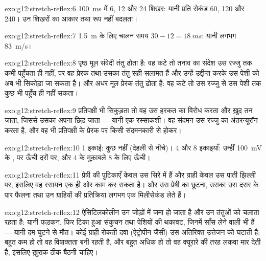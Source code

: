 \begin{solution}{exo:g12:stretch-reflex:6}
\qty{100}{ms} में 6, 12 और 24 शिखर: यानी प्रति सेकंड 60, 120 और 240। उन
शिखरों का आकार तथा रूप नहीं बदलता।
\end{solution}

\begin{solution}{exo:g12:stretch-reflex:7}
\qty{1.5}{m} के लिए चालन समय $30 - 12 = \qty{18}{ms}$: यानी लगभग
\qty{83}{m/s}।
\end{solution}

\begin{solution}{exo:g12:stretch-reflex:8}
पृष्ठ मूल संवेदी तंतु ढोता है: वह कटे तो तनाव का संदेश उस रज्जु तक कभी पहुँचता
ही नहीं, पर वह प्रेरक  तथा उसका तंतु सही-सलामत हैं और उन्हें उद्दीप्त
करके उस पेशी को अब भी सिकोड़ा जा सकता है। और अधर मूल प्रेरक तंतु ढोता है: वह
कटे तो उस रज्जु से उस पेशी तक कुछ भी पहुँच ही नहीं सकता।
\end{solution}

\begin{solution}{exo:g12:stretch-reflex:9}
प्रतिपक्षी भी सिकुड़ता तो वह उस हरकत का विरोध करता और ख़ुद तन जाता, जिससे
उसका अपना  छिड़ जाता --- यानी एक रस्साकशी। वह संदमन उस रज्जु का
अंतरन्यूरॉन करता है, और वह भी प्रतिपक्षी के प्रेरक  पर किसी
संदमनकारी  से होकर।
\end{solution}

\begin{solution}{exo:g12:stretch-reflex:10}
1 इकाई: कुछ नहीं (देहली से नीचे)। 4 और 8 इकाइयाँ: उन्हीं \qty{100}{mV} के
, पर ऊँची दरों पर, और 4 के मुक़ाबले 8 के लिए ऊँची।
\end{solution}

\begin{solution}{exo:g12:stretch-reflex:11}
प्रेषी की पुटिकाएँ केवल उस सिरे में हैं और ग्राही केवल उस पाती झिल्ली पर,
इसलिए वह रसायन एक ही ओर काम कर सकता है। और उस प्रेषी का छूटना, उसका उस दरार
के पार फैलना तथा उन ग्राहियों की प्रतिक्रिया लगभग एक मिलीसेकंड लेते हैं।
\end{solution}

\begin{solution}{exo:g12:stretch-reflex:12}
ऐसिटिलकोलीन उन जोड़ों में जमा हो जाता है और उन तंतुओं को चलाता रहता है:
यानी फड़कन, फिर टिका हुआ संकुचन तथा पेशियों की थकावट, जिनमें साँस लेने वाली
भी हैं --- यानी दम घुटने से मौत। कोई ग्राही रोकती दवा (ऐट्रोपीन जैसी) उस
अतिरिक्त उत्तेजन को घटाती है; बहुत कम हो तो वह विषाक्तता बनी रहती है, और
बहुत अधिक हो तो वह क्यूरारे की तरह लकवा मार देती है, इसलिए ख़ुराक ठीक बैठनी
चाहिए।
\end{solution}

